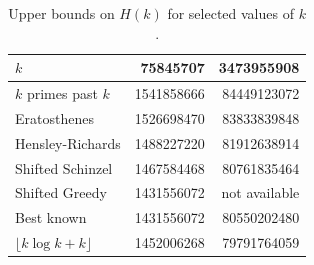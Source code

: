 \documentclass{bmcart}
\theoremstyle{plain}
\theoremstyle{definition}
\begin{document}
\begin{table}
\centering
\setlength{\extrarowheight}{2pt}
\caption{Upper bounds on $H(k)$ for selected values of $k$.}\label{klargetable}
\begin{tabular}{lrr}
\toprule
$k$                 & \num{75845707}   & \num{3473955908}  \\
\midrule
$k$ primes past $k$ & \num{1541858666} & \num{84449123072} \\
Eratosthenes        & \num{1526698470} & \num{83833839848} \\
Hensley-Richards    & \num{1488227220} & \num{81912638914} \\
Shifted Schinzel    & \num{1467584468} & \num{80761835464} \\
Shifted Greedy      & \num{1431556072} & not available\\
Best known         & \num{1431556072} & \num{80550202480} \\
\midrule
$\lfloor k\log k + k \rfloor$       & \num{1452006268}         & \num{79791764059} \\
\bottomrule
\end{tabular}
\end{table}




\end{document}

